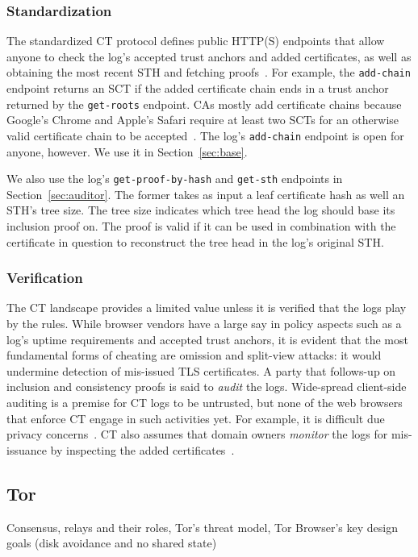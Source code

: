 \subsubsection{Standardization}
The standardized CT protocol defines public HTTP(S) endpoints that allow anyone
to check the log's accepted trust anchors and added certificates, as well as
obtaining the most recent STH and fetching proofs~\cite{ct,ct/bis}.  For
example, the \texttt{add-chain} endpoint returns an SCT if the added
certificate chain ends in a trust anchor returned by the \texttt{get-roots}
endpoint.  CAs mostly add certificate chains because Google's Chrome and
Apple's Safari require at least two SCTs for an otherwise valid certificate
chain to be accepted~\cite{chrome-policy,safari-policy}.  The log's
\texttt{add-chain} endpoint is open for anyone, however.  We use it in
Section~\ref{sec:base}.

We also use the log's \texttt{get-proof-by-hash} and \texttt{get-sth} endpoints
in Section~\ref{sec:auditor}.  The former takes as input a leaf certificate hash
as well an STH's tree size.  The tree size indicates which tree head the log
should base its inclusion proof on.  The proof is valid if it can be used in
combination with the certificate in question to reconstruct the tree head in the
log's original STH.

\subsubsection{Verification}
The CT landscape provides a limited value unless it is verified that the logs
play by the rules.  While browser vendors have a large say in policy aspects
such as a log's uptime requirements and accepted trust anchors, it is evident
that the most fundamental forms of cheating are omission and split-view
attacks:
	it would undermine detection of mis-issued TLS certificates.
A party that follows-up on inclusion and consistency proofs is said to
\emph{audit} the logs.  Wide-spread client-side auditing is a premise for CT
logs to be untrusted, but none of the web browsers that enforce CT
engage in such activities yet.  For example, it is difficult due privacy
concerns~\cite{ct-with-privacy}.  CT also assumes that domain owners
\emph{monitor} the logs for mis-issuance by inspecting the added
certificates~\cite{lwm,ct-monitors}.

\subsection{Tor} \label{sec:background:tor}
Consensus, relays and their roles, Tor's threat model, Tor Browser's key
design goals (disk avoidance and no shared state)

